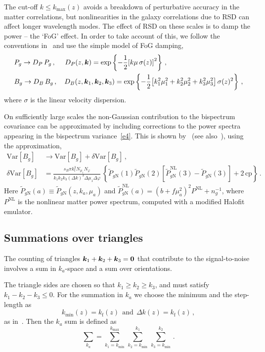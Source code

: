 The cut-off $k\leq k_\mathrm{max}(z)$ avoids a breakdown of perturbative accuracy in the matter correlations, but nonlinearities in the galaxy correlations due to RSD can affect longer wavelength modes. The effect of RSD on these scales is to damp the power -- the `FoG' effect. In order to take account of this, we follow the conventions in~\cite{Karagiannis:2018jdt,Yankelevich:2018uaz} and use the simple model of FoG damping,
\begin{align}
&P_g \to  D_P\, P_g\,,\quad~ D_{P}(z, \bm{k}) = \exp\left\{-\frac{1}{2}{\left[k\mu\,\sigma(z)\right]^{2}}\right\}\,, \\
&B_g \to  D_B\, B_g\,,  \quad D_{B}(z, \bm {k}_1,\bm {k}_2,\bm {k}_3) = \exp\left\{-\frac{1}{2}{\left[k_{1}^{2}\mu_{1}^{2}+k_{2}^{2}\mu_{2}^{2}+k_{3}^{2}\mu_{3}^{2}\right]\sigma(z)^{2}}\right\}\,, \label{e13}
\end{align}
where $\sigma$ is the linear velocity dispersion.

On sufficiently large scales the non-Gaussian contribution to the bispectrum covariance can be  approximated by including corrections to the power spectra appearing in the bispectrum variance~\eqref{e4}. This is shown by~\cite{Chan:2016ehg} (see also~\cite{Karagiannis:2018jdt}), using the approximation,
\begin{align}
\mathrm{Var} [B_{g}] &\to \mathrm{Var} [B_{g}]+ \delta \mathrm{Var} [B_{g}] \,, \\
\delta \mathrm{Var} [B_{g}] &= \frac{s_B\pi k_\mathrm{f}^3 N_{\mu_1} N_\varphi}{k_1 k_2 k_3 (\Delta k)^3\Delta \mu_1 \Delta \varphi}\, \left\{ \tilde{P}_{g \mathrm{N}}(1) \tilde{P}_{g \mathrm{N}}(2) \left[ \tilde{P}^\mathrm{NL}_{g \mathrm{N}}(3) - \tilde{P}_{g\mathrm{N}}(3) \right] + 2 \, \mbox{cp} \right\}\,.
\label{e4x}
\end{align}
Here $\tilde{P}_{g \mathrm{N}}(a) \equiv \tilde{P}_{g \mathrm{N}}(z,k_a,\mu_a)$ and $\tilde{P}^{\mathrm{NL}}_{g{\mathrm{N}}}(a) = (b + f \mu_a^2)^2 P^\mathrm{NL} + n_g^{-1}$, where $P^{\mathrm{NL}}$ is the nonlinear matter power spectrum, computed with a modified Halofit emulator.
%
%
\subsection{Summations over triangles}

The counting of triangles $\bm {k}_1 + \bm {k}_2 + \bm {k}_3 = \bm{0}$ that contribute to the signal-to-noise involves a sum in $k_a$-space and a sum over orientations.

The triangle sides are chosen so that $k_1\geq k_2 \geq k_3$, and must satisfy $k_1-k_2-k_3\leq 0$.
For the summation in $k_a$ we choose the minimum and the step-length as
\begin{equation}
k_\mathrm{min}(z) = k_\mathrm{f}(z)~~\mbox{and}~~ \Delta k(z)=k_{\mathrm{f}}(z) \,,
\end{equation}
as in~\cite{Karagiannis:2018jdt,Yankelevich:2018uaz}. 
Then the $k_a$ sum is defined as~\cite{Liguori:2010hx,Oddo:2019run}
\begin{equation}
\sum_{k_a} = \sum_{k_{1} = k_\mathrm{min}}^{k_\mathrm{max}} \, \sum_{k_{2}=k_{\mathrm{min}}}^{k_{1}}\,\sum_{k_{3}=k_{\mathrm{min}}}^{k_{2}}
\,.\label{e8}
\end{equation} 

